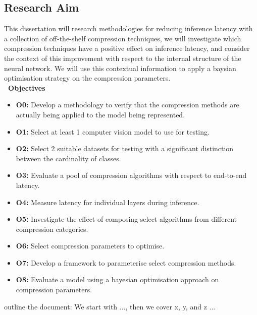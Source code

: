 \documentclass[../D1.tex]{subfiles}
\begin{document}
\subsection{Research Aim}
This dissertation will research methodologies for reducing inference latency with a collection of off-the-shelf compression techniques, we will investigate which compression techniques have a positive effect on inference latency, and consider the context of this improvement with respect to the internal structure of the neural network. 
We will use this contextual information to apply a baysian optimisation strategy on the compression parameters.\\
\textbf{\large~Objectives}
\begin{itemize}
    \item \textbf{O0:}\label{obj:VerifyComp} Develop a methodology to verify that the compression methods are actually being applied to the model being represented.
    \item \textbf{O1:}\label{obj:ModelSel} Select at least 1 computer vision model to use for testing.
    \item \textbf{O2:}\label{obj:DataSel} Select 2 suitable datasets for testing with a significant distinction between the  cardinality of classes.
    \item \textbf{O3:}\label{obj:EvalE2E} Evaluate a pool of compression algorithms with respect to end-to-end latency.
    \item \textbf{O4:}\label{obj:EvalLayer} Measure latency for individual layers during inference.
    \item \textbf{O5:}\label{obj:EvalComp} Investigate the effect of composing select algorithms from different compression categories. 
    \item \textbf{O6:}\label{obj:ParaSel} Select compression parameters to optimise.
    \item \textbf{O7:}\label{obj:CompPara} Develop a framework to parameterise select compression methods.
    \item \textbf{O8:}\label{obj:TestOpt} Evaluate a model using a bayesian optimisation approach on compression parameters.
\end{itemize}



outline the document: We start with ..., then we cover x, y, and z ...
\end{document}
